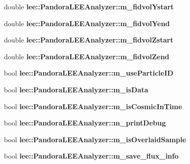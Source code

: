 \begin{DoxyCompactItemize}
\item 
\hypertarget{group__lee_ga678aca01684db5a8a9abcb6903a7eee5}{double {\bfseries lee\-::\-Pandora\-L\-E\-E\-Analyzer\-::m\-\_\-fidvol\-Ystart}}\label{group__lee_ga678aca01684db5a8a9abcb6903a7eee5}

\item 
\hypertarget{group__lee_gad8b5a3fbf63831101e06bf3f7c831a03}{double {\bfseries lee\-::\-Pandora\-L\-E\-E\-Analyzer\-::m\-\_\-fidvol\-Yend}}\label{group__lee_gad8b5a3fbf63831101e06bf3f7c831a03}

\item 
\hypertarget{group__lee_ga2ecd11cab7811730100be8a133cb686f}{double {\bfseries lee\-::\-Pandora\-L\-E\-E\-Analyzer\-::m\-\_\-fidvol\-Zstart}}\label{group__lee_ga2ecd11cab7811730100be8a133cb686f}

\item 
\hypertarget{group__lee_gab2b230f2c1c2991564e8078fa7ce52e9}{double {\bfseries lee\-::\-Pandora\-L\-E\-E\-Analyzer\-::m\-\_\-fidvol\-Zend}}\label{group__lee_gab2b230f2c1c2991564e8078fa7ce52e9}

\item 
\hypertarget{group__lee_ga0418238c0019b7fe0bad6117348ff4f3}{bool {\bfseries lee\-::\-Pandora\-L\-E\-E\-Analyzer\-::m\-\_\-use\-Particle\-I\-D}}\label{group__lee_ga0418238c0019b7fe0bad6117348ff4f3}

\item 
\hypertarget{group__lee_ga6dde30dd232da74cc8e5735babb021c8}{bool {\bfseries lee\-::\-Pandora\-L\-E\-E\-Analyzer\-::m\-\_\-is\-Data}}\label{group__lee_ga6dde30dd232da74cc8e5735babb021c8}

\item 
\hypertarget{group__lee_ga10e86bba3e7853bdf00765cb996830fb}{bool {\bfseries lee\-::\-Pandora\-L\-E\-E\-Analyzer\-::m\-\_\-is\-Cosmic\-In\-Time}}\label{group__lee_ga10e86bba3e7853bdf00765cb996830fb}

\item 
\hypertarget{group__lee_ga355302cac15228cf63650efc20765ab8}{bool {\bfseries lee\-::\-Pandora\-L\-E\-E\-Analyzer\-::m\-\_\-print\-Debug}}\label{group__lee_ga355302cac15228cf63650efc20765ab8}

\item 
\hypertarget{group__lee_gaf8c9bf05e68b489be6944d9b6ad9075f}{bool {\bfseries lee\-::\-Pandora\-L\-E\-E\-Analyzer\-::m\-\_\-is\-Overlaid\-Sample}}\label{group__lee_gaf8c9bf05e68b489be6944d9b6ad9075f}

\item 
\hypertarget{group__lee_ga9f323d5b266d64aa73a45e50ac3e1fe6}{bool {\bfseries lee\-::\-Pandora\-L\-E\-E\-Analyzer\-::m\-\_\-save\-\_\-flux\-\_\-info}}\label{group__lee_ga9f323d5b266d64aa73a45e50ac3e1fe6}


\end{DoxyCompactItemize}
